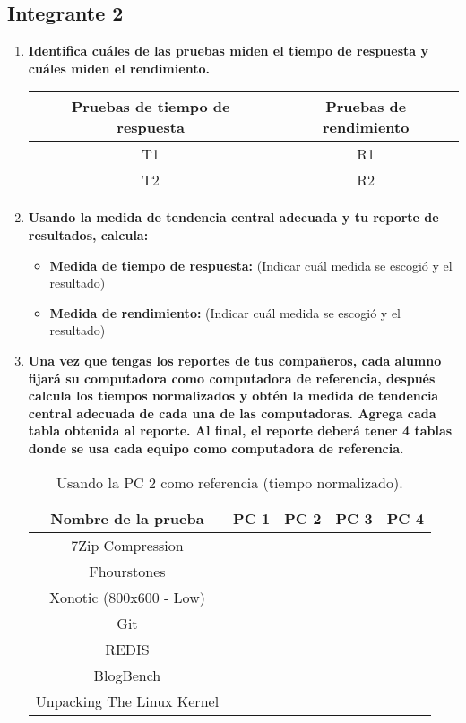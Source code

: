 \documentclass[12pt]{article}
\newcommand{\pl}[1]{\item \textbf{ #1 }}
\begin{document}
\subsection{Integrante 2}

\begin{enumerate}[label=(\arabic{section}.\arabic{subsection}.\arabic{enumi})]
    \pl{Identifica cuáles de las pruebas miden el tiempo de respuesta y cuáles miden el rendimiento.}
    \begin{table}[htb]
        \centering
        \begin{tabular}{|c|c|}
        \hline
        Pruebas de tiempo de respuesta & Pruebas de rendimiento \\
        \hline
        T1 & R1 \\
        \hline
        T2 & R2 \\
        \hline
        \end{tabular}
    \end{table}\par

    \pl{Usando la medida de tendencia central adecuada y tu reporte de resultados, calcula:}
    \begin{itemize}
        \pl{Medida de tiempo de respuesta:}(Indicar cuál medida se escogió y el resultado)\par
    
        \pl{Medida de rendimiento:} (Indicar cuál medida se escogió y el resultado)\par
    \end{itemize}

    \pl{Una vez que tengas los reportes de tus compañeros, cada alumno fijará su computadora como computadora de referencia, después calcula los tiempos normalizados y obtén la medida de tendencia central adecuada de cada una de las computadoras. Agrega cada tabla obtenida al reporte. Al final, el reporte deberá tener 4 tablas donde se usa cada equipo como computadora de referencia.}

    \begin{table}[htb]
        \centering
        \begin{tabular}{|c|c|c|c|c|}
        \hline
        \textbf{Nombre de la prueba} & \textbf{PC 1} & \textbf{PC 2} & \textbf{PC 3} & \textbf{PC 4}\\
        \hline
        7Zip Compression & & & & \\
        \hline
        Fhourstones & & & & \\
        \hline
        Xonotic (800x600 - Low) & & & &  \\
        \hline
        Git & & & &  \\
        \hline
        REDIS & & & &  \\
        \hline
        BlogBench & & & &  \\
        \hline
        Unpacking The Linux Kernel & & & & \\
        \hline
        \end{tabular}
        \caption{Usando la PC 2 como referencia (tiempo normalizado).}
    \end{table}


\end{enumerate}
\end{document}
